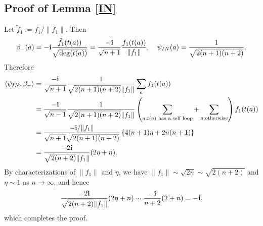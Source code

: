 \documentclass[a4paper,12pt]{article}
\newcommand{\bs}[1]{\boldsymbol{#1}}
\newcommand{\im}{\bs{\rm i}}
\numberwithin{equation}{section}
\begin{document}
\subsection{Proof of Lemma \ref{IN}}
\label{section-IN}
Let $\tilde f_1 := f_1 / \|f_1\|$. 
Then
\begin{equation*}
\beta_-(a) = -\im \frac{\tilde f_1(t(a))}{\sqrt{\deg(t(a))}} = \frac{- \im }{\sqrt{n+1}} \frac{f_1(t(a))}{\|f_1\|},\quad \psi_{IN}(a) = \frac{1}{\sqrt{2(n+1)(n+2)}}.
\end{equation*}
Therefore
\begin{align*}
\langle \psi_{IN}, \beta_- \rangle &= \frac{- \im }{\sqrt{n+1}} \frac{1}{\sqrt{2(n+1)(n+2)} \|f_1\|} \sum_{a} f_1(t(a))\\
	&=  \frac{- \im }{\sqrt{n-1}} \frac{1}{\sqrt{2(n+1)(n+2)} \|f_1\|}\left( \sum_{a:t(a)\text{ has a self loop}} + \sum_{a : \text{otherwise}} \right) f_1(t(a))\\
	&=  \frac{-\im /\|f_1\| }{\sqrt{n+1}\sqrt{2(n+1)(n+2)} } \left\{ 4(n+1)\eta + 2n(n+1)\right\}\\
	&= \frac{-2\im }{\sqrt{2(n+2)}\|f_1\|}(2\eta + n).
\end{align*}
By characterizations of $\|f_1\|$ and $\eta$, we have $\|f_1\|\sim \sqrt{2n}\sim \sqrt{2(n+2)}$ and $\eta \sim 1$ as $n\to \infty$, and hence
\begin{equation*}
\frac{-2\im }{\sqrt{2(n+2)}\|f_1\|}(2\eta + n) \sim \frac{-\im }{n+2}(2+n) = -\im,
\end{equation*}
which completes the proof.


\end{document}
